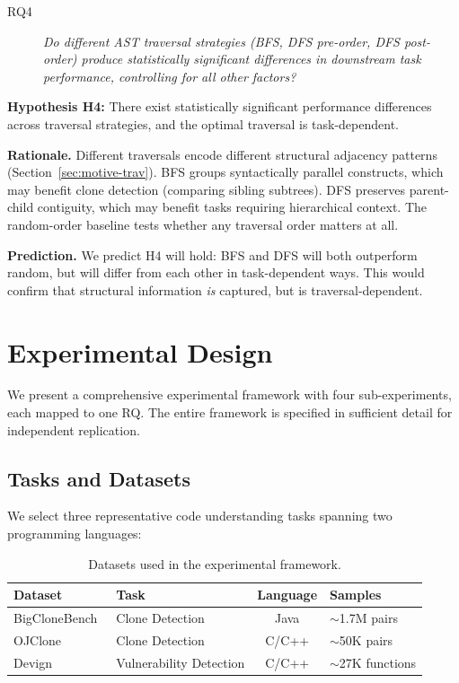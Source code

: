 \documentclass[pdflatex,sn-mathphys,Numbered]{sn-jnl}
\newcommand{\BCB}{Big\-Clone\-Bench}
\newcommand{\OJC}{OJ\-Clone}
\newcommand{\Dev}{Devign}
\begin{document}
\begin{description}
\item[RQ4] \textit{Do different AST traversal strategies (BFS, DFS pre-order, DFS post-order) produce statistically significant differences in downstream task performance, controlling for all other factors?}
\end{description}

\textbf{Hypothesis H4:} There exist statistically significant performance differences across traversal strategies, and the optimal traversal is task-dependent.

\textbf{Rationale.} Different traversals encode different structural adjacency patterns (Section~\ref{sec:motive-trav}). BFS groups syntactically parallel constructs, which may benefit clone detection (comparing sibling subtrees). DFS preserves parent-child contiguity, which may benefit tasks requiring hierarchical context. The random-order baseline tests whether any traversal order matters at all.

\textbf{Prediction.} We predict H4 will hold: BFS and DFS will both outperform random, but will differ from each other in task-dependent ways. This would confirm that structural information \emph{is} captured, but is traversal-dependent.

\section{Experimental Design}\label{sec:expt}

We present a comprehensive experimental framework with four sub-experiments, each mapped to one RQ. The entire framework is specified in sufficient detail for independent replication.

\subsection{Tasks and Datasets}

We select three representative code understanding tasks spanning two programming languages:

\begin{table}[tb]
\centering
\caption{Datasets used in the experimental framework.}\label{tab:datasets}
\begin{tabular}{llcl}
\toprule
Dataset & Task & Language & Samples \\
\midrule
\BCB{}~\citep{svajlenko2014bigclonebench,svajlenko2018bigclonebench} &
  Clone Detection & Java & $\sim$1.7M pairs \\
\OJC{}~\citep{mou2016ojclone} &
  Clone Detection & C/C++ & $\sim$50K pairs \\
\Dev{}~\citep{zhou2019devign} &
  Vulnerability Detection & C/C++ & $\sim$27K functions \\
\bottomrule
\end{tabular}
\end{table}
\end{document}
